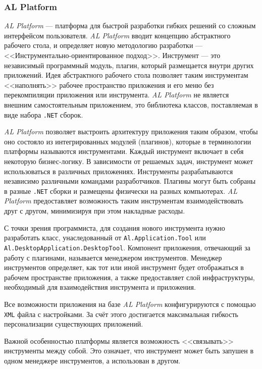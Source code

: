 \subsubsection{AL Platform}

{\it AL Platform} --- платформа для быстрой разработки гибких решений со сложным интерфейсом пользователя. {\it AL Platform} вводит концепцию абстрактного рабочего стола, и определяет новую методологию разработки --- <<Инструментально-ориентированное подход>>. Инструмент --- это независимый программный модуль, плагин, который размещается внутри других приложений. Идея абстрактного рабочего стола позволяет таким инструментам <<наполнять>> рабочее пространство приложения и его меню без перекомпиляции приложения или инструмента. {\it AL Platform} не является внешним самостоятельным приложением, это библиотека классов, поставляемая в виде набора {\tt .NET} сборок. 

{\it AL Platform} позволяет выстроить архитектуру приложения таким образом, чтобы оно состояло из интегрированных модулей (плагинов), которые в терминологии платформы называются инструментами. Каждый инструмент включает в себя некоторую бизнес-логику. В зависимости от решаемых задач, инструмент может использоваться в различных приложениях. Инструменты разрабатываются независимо различными командами разработчиков. Плагины могут быть собраны в разные {\tt .NET} сборки и размещены физически на разных компьютерах. {\it AL Platform} предоставляет возможность таким инструментам взаимодействовать друг с другом, минимизируя при этом накладные расходы.

С точки зрения программиста, для создания нового инструмента нужно разработать класс, унаследованный от {\tt Al.Application.Tool} или {\tt Al.DesktopApplication.DesktopTool}. Компонент приложения, отвечающий за работу с плагинами, называется менеджером инструментов. Менеджер инструментов определяет, как тот или иной инструмент будет отображаться в рабочем пространстве приложения, а также предоставляет слой инфраструктуры, необходимый для взаимодействия инструмента и приложения. 

Все возможности приложения на базе {\it AL Platform} конфигурируются с помощью {\tt XML} файла с настройками. За счёт этого достигается максимальная гибкость персонализации существующих приложений.

Важной особенностью платформы является возможность <<связывать>> инструменты между собой. Это означает, что инструмент может быть запушен в одном менеджере инструментов, а использован в другом.